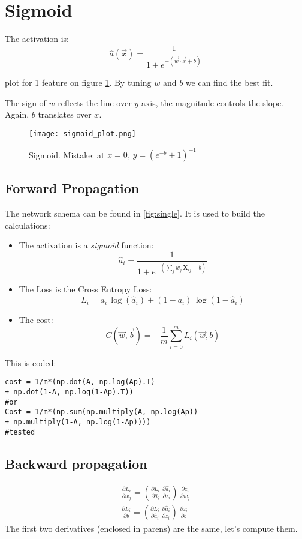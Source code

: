 \section{Sigmoid}
The activation is:
\[
  \hat{a}(\vec{x})= \frac{1}{1+e^{-(\vec{w}\cdot{}\vec{x}+b)}}
\]

plot for 1 feature on figure \ref{fig:sigmoid}. By tuning $w$ and $b$  we can find the best fit. 

The sign of $w$ reflects the line over $y$ axis, the magnitude controls the slope. Again, $b$ translates over $x$.

\begin{figure}[h]
 \centering
 \texttt{[image: sigmoid\_plot.png]}
  \caption{Sigmoid. Mistake: at $x=0$, $y=(e^{-b}+1)^{-1}$} \label{fig:sigmoid}
\end{figure}

\subsection{Forward Propagation}
The network schema can be found in \ref{fig:single}. It is used to build the calculations:

\begin{itemize}
  \item The activation is a \textit{sigmoid} function:
\[
  \hat{a}_i = \frac{1}{1+e^{-(\sum_j w_j\, \mathbf{X}_{ij} + b)}}
\]

  \item The Loss is the Cross Entropy Loss:
\[
  L_i = a_i\,\log(\hat{a}_i) + (1-a_i)\,\log(1-\hat{a}_i)
\]

\item The cost:
\[
  C(\vec{w}, \vec{b}) = -\frac{1}{m}\sum_{i=0}^m L_i(\vec{w}, b)
\]
\end{itemize}
This is coded:
\begin{verbatim}
cost = 1/m*(np.dot(A, np.log(Ap).T) 
+ np.dot(1-A, np.log(1-Ap).T))
#or
Cost = 1/m*(np.sum(np.multiply(A, np.log(Ap)) 
+ np.multiply(1-A, np.log(1-Ap))))
#tested
\end{verbatim}

\subsection{Backward propagation}

\begin{align}
  \frac{\partial L_i}{\partial w_j} = 
  \left(\frac{\partial L_i}{\partial \hat{a}_i}\, \frac{\partial \hat{a}_i}{\partial z_i}\right)\,\frac{\partial z_i}{\partial w_j}\\
  \frac{\partial L_i}{\partial b} = 
  \left(\frac{\partial L_i}{\partial \hat{a}_i}\,\frac{\partial \hat{a}_i}{\partial z_i}\right)\,\frac{\partial z_i}{\partial b}
\end{align}
The first two derivatives (enclosed in parens) are the same, let's compute them.

